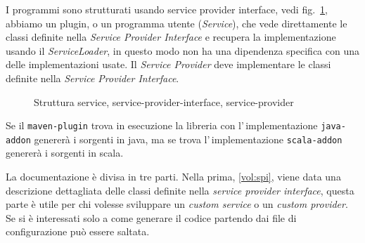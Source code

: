 \documentclass[a4paper,10pt]{report}
\begin{document}
I programmi sono strutturati usando service provider interface, 
vedi fig.~\ref{fig:spi}, abbiamo un plugin, o un programma utente 
(\textsl{Service}), che vede direttamente le classi definite nella 
\textsl{Service Provider Interface} e recupera la implementazione usando il 
\textsl{ServiceLoader}, in questo modo non ha una dipendenza specifica con una
delle implementazioni usate. 
Il \textsl{Service Provider} deve implementare le classi definite nella 
\textsl{Service Provider Interface}.

\begin{figure}[!htb]
\centering
{}
\caption{Struttura service, service-provider-interface, service-provider} 
\label{fig:spi}
\end{figure}

Se il \verb!maven-plugin! trova in esecuzione la libreria con 
l'\,implementazione \verb!java-addon! genererà i sorgenti in java, ma se trova
l'\,implementazione \verb!scala-addon! genererà i sorgenti in scala.

La documentazione è divisa in tre parti. Nella prima, \ref{vol:spi}, viene data 
una descrizione dettagliata delle classi definite nella 
\textsl{service provider interface}, questa parte è utile per chi volesse 
sviluppare un \textit{custom service} o un \textit{custom provider}. 
Se si è interessati solo a come generare il codice partendo dai file di 
configurazione può essere saltata.
\end{document}
